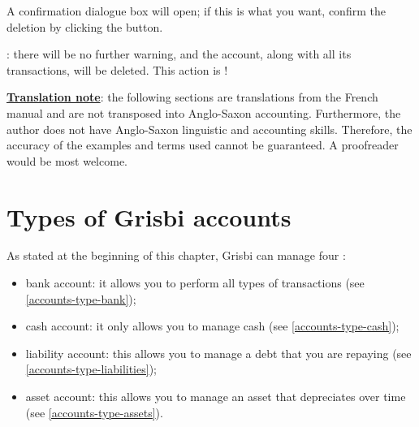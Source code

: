 A confirmation dialogue box will open; if this is what you want, confirm the deletion by clicking the  button.

\Attention{}: there will be no further warning, and the account, along with all its transactions, will be deleted. This action is !
\newline

\noindent
\underline{\textbf{Translation note}}: the following sections are translations from the French manual and are not transposed into Anglo-Saxon accounting. Furthermore, the author does not have Anglo-Saxon linguistic and accounting skills. Therefore, the accuracy of the examples and terms used cannot be guaranteed.
\newline
A proofreader would be most welcome.

\section{Types of Grisbi accounts\label{accounts-type}}%

As stated at the beginning of this chapter, Grisbi can manage four :

\begin{itemize}
	\item bank account: it allows you to perform all types of transactions (see \vref{accounts-type-bank});
	\item cash account: it only allows you to manage cash (see \vref{accounts-type-cash});
	\item liability account: this allows you to manage a debt that you are repaying (see \vref{accounts-type-liabilities});
	\item asset account: this allows you to manage an asset that depreciates over time (see \vref{accounts-type-assets}).
\end{itemize}


